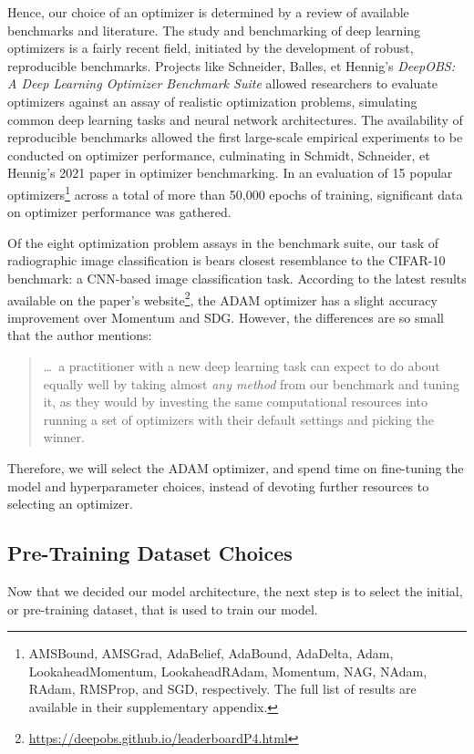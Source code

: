 Hence, our choice of an optimizer is determined by a review of available benchmarks and literature. The study and benchmarking of deep learning optimizers is a fairly recent field, initiated by the development of robust, reproducible benchmarks. Projects like Schneider, Balles, et Hennig's \emph{DeepOBS: A Deep Learning Optimizer Benchmark Suite} allowed researchers to evaluate optimizers against an assay of realistic optimization problems, simulating common deep learning tasks and neural network architectures. \autocite{deepobs} The availability of reproducible benchmarks allowed the first large-scale empirical experiments to be conducted on optimizer performance, culminating in Schmidt, Schneider, et Hennig's 2021 paper in optimizer benchmarking. \autocite{crowdedvalley} In an evaluation of 15 popular optimizers\footnote{AMSBound, AMSGrad, AdaBelief, AdaBound, AdaDelta, Adam, LookaheadMomentum, LookaheadRAdam, Momentum, NAG, NAdam, RAdam, RMSProp, and SGD, respectively. The full list of results are available in their supplementary appendix.} across a total of more than 50,000 epochs of training, significant data on optimizer performance was gathered.

Of the eight optimization problem assays in the benchmark suite, our task of radiographic image classification is bears closest resemblance to the CIFAR-10 benchmark: a CNN-based image classification task. According to the latest results available on the paper's website\footnote{\url{https://deepobs.github.io/leaderboardP4.html}}, the ADAM optimizer has a slight accuracy improvement over Momentum and SDG. However, the differences are so small that the author mentions: \blockcquote[2]{crowdedvalley}{
    \ldots\ a practitioner with a new deep learning task can expect to do about equally well by taking almost \emph{any method} from our benchmark and tuning it, as they would by investing the same computational resources into running a set of optimizers with their default settings and picking the winner.
}

\noindent
Therefore, we will select the ADAM optimizer, and spend time on fine-tuning the model and hyperparameter choices, instead of devoting further resources to selecting an optimizer.

\subsection{Pre-Training Dataset Choices}

Now that we decided our model architecture, the next step is to select the initial, or pre-training dataset, that is used to train our model.


